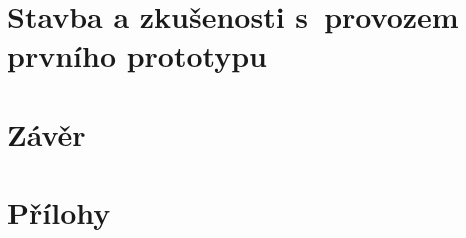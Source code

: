 \documentclass [a4paper,11pt,oneside,notitlepage,openright]{report} %
\begin{document}
	\part{Stavba a zkušenosti s~provozem prvního prototypu}\label{part:stavba}
		
	\part{Závěr}\label{part:zaver}
		



\nocite{*} %

\cleardoublepage




\part{Přílohy}
\begin{appendix}
%	
	
\end{appendix}
\end{document}
